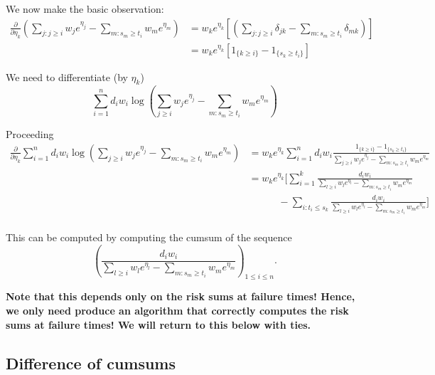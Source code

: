\documentclass{article}
\begin{document}
We now make the basic observation:
$$
\begin{aligned}
    \frac{\partial}{\partial \eta_k} \left(\sum_{j:j \geq i} w_j e^{\eta_j} - \sum_{m:s_m \geq t_i} w_m e^{\eta_m} \right) &= w_k e^{\eta_k}\left[ \left(\sum_{j:j \geq i} \delta_{jk} - 
    \sum_{m: s_m \geq t_i} \delta_{mk} \right) \right] \\
    &= w_k e^{\eta_k} \left[ 1_{\{k \geq i\}} - 1_{\{s_k \geq t_i\}} \right]
\end{aligned}
$$

 We need to differentiate (by $\eta_k$)
\begin{equation}
   \sum_{i = 1}^n d_i w_i \log \left(\sum_{j \geq i} w_j e^{\eta_j} - \sum_{m:s_m \geq t_i} w_m e^{\eta_m} \right)
\end{equation}

Proceeding
\begin{equation}
\begin{aligned}
   \frac{\partial}{\partial \eta_k} \sum_{i = 1}^n d_i w_i \log \left(\sum_{j \geq i} w_j e^{\eta_j}- \sum_{m:s_m \geq t_i} w_m e^{\eta_m} \right) 
   &= w_k e^{\eta_k} \sum_{i=1}^n  d_i w_i \frac{1_{\{k \geq i\}} - 1_{\{s_k \geq t_i\}} } 
   {\sum_{j \geq i} w_j e^{\eta_j}- \sum_{m:s_m \geq t_i} w_m e^{\eta_m} } \\
   &= w_k e^{\eta_k}\biggl[ \sum_{i=1}^k  \frac{ d_i w_i} 
   {\sum_{l \geq i} w_l e^{\eta_l}- \sum_{m:s_m \geq t_i} w_m e^{\eta_m} }   \\
   & \qquad \quad - \sum_{i:t_i \leq s_k} \frac{ d_i w_i} 
   {\sum_{l \geq i} w_l e^{\eta_l}- \sum_{m:s_m \geq t_i} w_m e^{\eta_m} }\biggr] \\
   \end{aligned}
\end{equation}

This can be computed by computing the cumsum of  the sequence
$$
\left( \frac{ d_i w_i} 
   {\sum_{l \geq i} w_l e^{\eta_l}- \sum_{m:s_m \geq t_i} w_m e^{\eta_m} } \right)_{1 \leq i \leq n}.
$$

{\bf Note that this depends only on the risk sums at 
failure times! Hence, we only need produce an algorithm
that correctly computes the risk sums at failure times! We will return to this below with ties.}

\subsection{Difference of cumsums}
\end{document}
